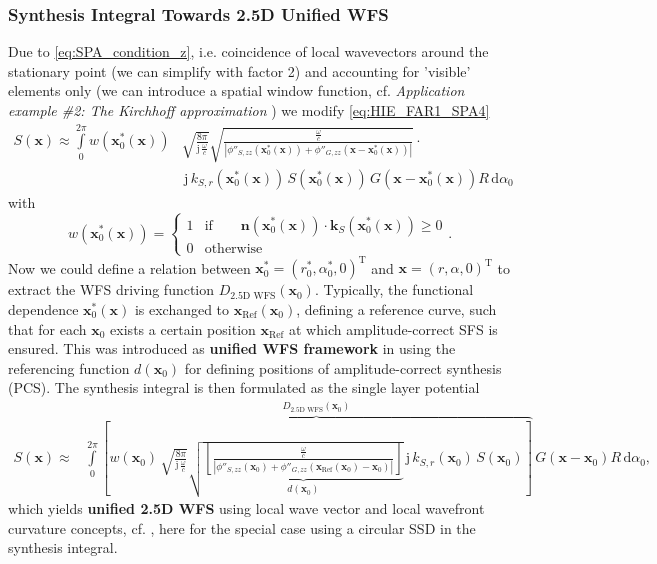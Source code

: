 \documentclass[a4paper,BCOR=15mm,10pt,twoside]{scrartcl}
\newcommand\im{\mathrm{j}}  %
\newcommand\fsd{\mathrm{d}}  %
\newcommand\wc{\frac{\omega}{c}}  %
\newcommand\jwc{\im\,\frac{\omega}{c}}  %
\newcommand\azx{\alpha}  %
\renewcommand{\vec}[1]{\mathbf{#1}}  %
\newcommand\unitn{\vec{n}}  %
\begin{document}
\subsubsection{Synthesis Integral Towards 2.5D Unified WFS}
Due to \eqref{eq:SPA_condition_z}, i.e. coincidence of local wavevectors around the stationary point (we can simplify with factor 2) and accounting for 'visible' elements only (we can introduce a spatial window function, cf. \textit{Application example \#2: The Kirchhoff approximation} \cite[p.46]{Firtha2018Diss}) we modify \eqref{eq:HIE_FAR1_SPA4}
%
\begin{align}
\label{eq:HIE_FAR1_SPA7}
S(\vec{x}) \approx \int\limits_{0}^{2\pi} 
w(\vec{x}_0^*(\vec{x})) & \sqrt{\frac{8\pi}{\jwc}}
\sqrt{\frac{\wc}{|\phi''_{S,zz}(\vec{x}_0^*(\vec{x}))+\phi''_{G,zz}(\vec{x}-\vec{x}_0^*(\vec{x}))|}} \cdot \nonumber\\
& \,\im \, k_{S,r}(\vec{x}_0^*(\vec{x})) \,
S(\vec{x}_0^*(\vec{x}))\,G(\vec{x}-\vec{x}_0^*(\vec{x}))
R \, \fsd \azx_0
\end{align}
%
with
%
\begin{equation}\label{eq:as}
w(\vec{x}_0^*(\vec{x})) =
    \begin{cases}
      1 &  \text{if}\qquad
       \unitn(\vec{x}_0^*(\vec{x})) \cdot \vec{k}_S(\vec{x}_0^*(\vec{x})) \geq 0 \\
      0 & \text{otherwise}
    \end{cases}.
\end{equation}
%
Now we could define a relation between $\vec{x}_0^*=(r_0^*,\azx_0^*,0)^\mathrm{T}$ and $\vec{x}=(r,\azx,0)^\mathrm{T}$ to extract the WFS driving function $D_\text{2.5D WFS}(\vec{x}_0)$.
Typically, the functional dependence $\vec{x}_0^*(\vec{x})$ is exchanged to $\vec{x}_\text{Ref}(\vec{x}_0)$, defining a reference curve, such that for each $\vec{x}_0$ exists a certain position $\vec{x}_\text{Ref}$ at which amplitude-correct SFS is ensured.
This was introduced as \textbf{unified WFS framework} in \cite[Sec. IIIB]{Firtha2017} using the referencing function $d(\vec{x}_0)$ for defining positions of amplitude-correct synthesis (PCS).
The synthesis integral is then formulated as the single layer potential
%
\begin{align}
\label{eq:HIE_FAR1_SPA8}
S(\vec{x}) \approx & \int\limits_{0}^{2\pi}
\overbrace{\left[
w(\vec{x}_0)\,\sqrt{\frac{8\pi}{\jwc}}
\sqrt{\underbrace{\left[\frac{\wc}{|\phi''_{S,zz}(\vec{x}_0)+\phi''_{G,zz}(\vec{x}_\text{Ref}(\vec{x}_0)-\vec{x}_0)|}\right]}_{d(\vec{x}_0)}} 
\,\im \, k_{S,r}(\vec{x}_0) \,
S(\vec{x}_0)\right]}^{D_\text{2.5D WFS}(\vec{x}_0)}\,G(\vec{x}-\vec{x}_0)
R \, \fsd \azx_0,
\end{align}
%
which yields \textbf{unified 2.5D WFS} using local wave vector and local wavefront curvature concepts, cf. \cite[Sec. 4.1.3]{Firtha2018Diss}, here for the special case using a circular SSD in the synthesis integral.
\end{document}
